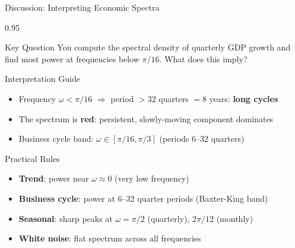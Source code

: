 \documentclass[9pt, aspectratio=169, t]{beamer}
\begin{document}
\begin{frame}{Discussion: Interpreting Economic Spectra}
    \begin{cminipage}{0.95\textwidth}
    \vspace{-0.2cm}
    {\small
    \begin{alertblock}{Key Question}
        You compute the spectral density of quarterly GDP growth and find most power at frequencies below $\pi/16$. What does this imply?
    \end{alertblock}
    \begin{block}{Interpretation Guide}
        \begin{itemize}\setlength{\itemsep}{0pt}
            \item Frequency $\omega < \pi/16$ $\Rightarrow$ period $> 32$ quarters $= 8$ years: \textbf{long cycles}
            \item The spectrum is \textbf{red}: persistent, slowly-moving component dominates
            \item Business cycle band: $\omega \in [\pi/16, \pi/3]$ (periods 6--32 quarters)
        \end{itemize}
    \end{block}
    \begin{exampleblock}{Practical Rules}
        \begin{itemize}\setlength{\itemsep}{0pt}
            \item \textbf{Trend}: power near $\omega \approx 0$ (very low frequency)
            \item \textbf{Business cycle}: power at 6--32 quarter periods (Baxter-King band)
            \item \textbf{Seasonal}: sharp peaks at $\omega = \pi/2$ (quarterly), $2\pi/12$ (monthly)
            \item \textbf{White noise}: flat spectrum across all frequencies
        \end{itemize}
    \end{exampleblock}
    }
    \end{cminipage}
\end{frame}
\end{document}
